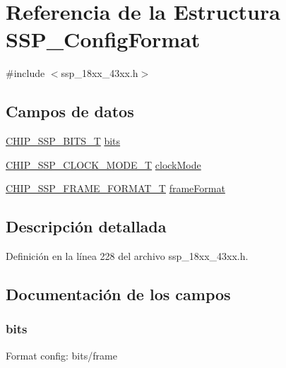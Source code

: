 \hypertarget{struct_s_s_p___config_format}{}\section{Referencia de la Estructura S\+S\+P\+\_\+\+Config\+Format}
\label{struct_s_s_p___config_format}


{\ttfamily \#include $<$ssp\+\_\+18xx\+\_\+43xx.\+h$>$}

\subsection*{Campos de datos}
\begin{DoxyCompactItemize}
\item 
\hyperlink{group___s_s_p__18_x_x__43_x_x_ga4e348748c4fb42ef94c2cbd968a43648}{C\+H\+I\+P\+\_\+\+S\+S\+P\+\_\+\+B\+I\+T\+S\+\_\+T} \hyperlink{struct_s_s_p___config_format_a1f54868a0645f65bd9d946b9fd305ca2}{bits}
\item 
\hyperlink{group___s_s_p__18_x_x__43_x_x_ga12dec81e345a9ffbefd6a1fae5759e09}{C\+H\+I\+P\+\_\+\+S\+S\+P\+\_\+\+C\+L\+O\+C\+K\+\_\+\+M\+O\+D\+E\+\_\+T} \hyperlink{struct_s_s_p___config_format_aea7fde50f1241fb6909f613283e25db1}{clock\+Mode}
\item 
\hyperlink{group___s_s_p__18_x_x__43_x_x_ga207687847d9ab8385057ddeca53c2942}{C\+H\+I\+P\+\_\+\+S\+S\+P\+\_\+\+F\+R\+A\+M\+E\+\_\+\+F\+O\+R\+M\+A\+T\+\_\+T} \hyperlink{struct_s_s_p___config_format_ae0bcdd44e7013f8593095c1383b784b2}{frame\+Format}
\end{DoxyCompactItemize}


\subsection{Descripción detallada}


Definición en la línea 228 del archivo ssp\+\_\+18xx\+\_\+43xx.\+h.



\subsection{Documentación de los campos}
\subsubsection[{\texorpdfstring{bits}{bits}}]{ bits}\hypertarget{struct_s_s_p___config_format_a1f54868a0645f65bd9d946b9fd305ca2}{}\label{struct_s_s_p___config_format_a1f54868a0645f65bd9d946b9fd305ca2}
Format config\+: bits/frame 

